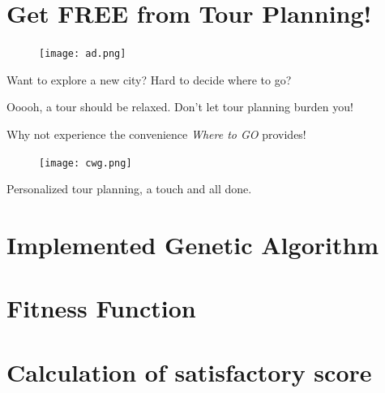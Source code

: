 \documentclass{mcmthesis}
\begin{document}
\section*{Get FREE from Tour Planning!}
  \begin{figure}[ht]
    \centering
    \texttt{[image: ad.png]}
  \end{figure}
Want to explore a new city? Hard to decide where to go? \par
Ooooh, a tour should be relaxed. Don't let tour planning burden you! \par
  \centering
Why not experience the convenience \emph{Where to GO} provides!\par
  \begin{figure}[ht]
    \centering
    \texttt{[image: cwg.png]}
  \end{figure}
\begin{large}
  Personalized tour planning, a touch and all done.
\end{large}

	

	
\newpage

\begin{appendices}
  \section{Implemented Genetic Algorithm}
  
  \section{Fitness Function}
  
  \section{Calculation of satisfactory score}
  
\end{appendices}
\end{document}
